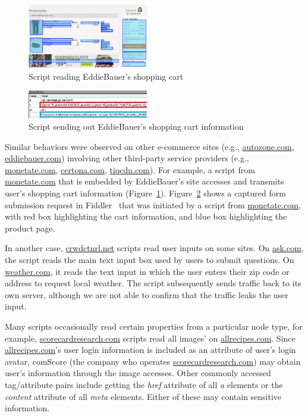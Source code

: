 \begin{figure}[tbh]
\centering
\includegraphics[width=0.47\textwidth]{figures/chapter6/EddieBauerCart}
\caption{Script reading EddieBauer's shopping cart}
\label{fig:EddieBauerCart}
\end{figure}

\begin{figure}[tbh]
\centering
\includegraphics[width=0.47\textwidth]{figures/chapter6/EddieBauerRequest}
\caption{Script sending out EddieBauer's shopping cart information}
\label{fig:EddieBauerRequest}
\end{figure}

Similar behaviors were observed on other e-commerce sites (e.g.,
\url{autozone.com}, \url{eddiebauer.com}) involving other third-party
service providers (e.g., \url{monetate.com}, \url{certona.com},
\url{tiqcdn.com}).  For example, a script from \url{monetate.com} that
is embedded by EddieBauer's site accesses and transmits user's shopping
cart information (Figure~\ref{fig:EddieBauerCart}).
Figure~\ref{fig:EddieBauerRequest} shows a captured form submission
request in Fiddler~\cite{Fiddler} that was initiated by a script from
\url{monetate.com}, with red box highlighting the cart information, and
blue box highlighting the product page.

In another case, \url{crwdctnrl.net} scripts read user inputs on some
sites.  On \url{ask.com}, the script reads the main text input box used
by users to submit questions.  On \url{weather.com}, it reads the text
input in which the user enters their zip code or address to request
local weather.  The script subsequently sends traffic back to its own
server, although we are not able to confirm that the traffic leaks the
user input.

Many scripts occasionally read certain properties from a particular node
type, for example, \url{scorecardresearch.com} scripts read all images'
 on \url{allrecipes.com}.  Since \url{allrecipes.com}'s
user login information is included as an attribute of user's login
avatar, comScore (the company who operates \url{scorecardresearch.com})
may obtain user's information through the image accesses.  Other
commonly accessed tag/attribute pairs include getting the \emph{href}
attribute of all \emph{a} elements or the \emph{content} attribute of
all \emph{meta} elements.  Either of these may contain sensitive
information.

